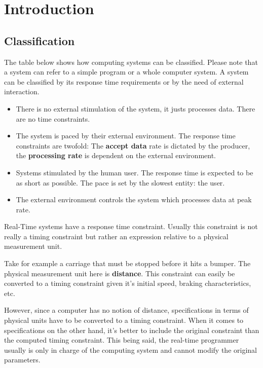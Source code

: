 \chapter{Introduction}

\section{Classification}

The table below shows how computing systems can be classified. Please note that a system can refer to a simple program or a whole computer system. A system can be classified by its response time requirements or by the need of external interaction. 

\begin{itemize}
	\item {} 
	There is no external stimulation of the system, it justs processes data. There are no time constraints.
	\item {}
	The system is paced by their external environment. The response time constraints are twofold: The \textbf{accept data} rate is dictated by the producer, the \textbf{processing rate} is dependent on the external environment.
	\item {}
	Systems stimulated by the human user. The response time is expected to be as short as possible. The pace is set by the slowest entity: the user.
	\item {}
	The external environment controls the system which processes data at peak rate.
\end{itemize}

Real-Time systems have a response time constraint. Usually this constraint is not really a timing constraint but rather an expression relative to a physical measurement unit.

\begin{exmp}
Take for example a carriage that must be stopped before it hits a bumper. The physical measurement unit here is \textbf{distance}. This constraint can easily be converted to a timing constraint given it's initial speed, braking characteristics, etc. 
\end{exmp}

However, since a computer has no notion of distance, specifications in terms of physical units have to be converted to a timing constraint.
When it comes to specifications on the other hand, it's better to include the original constraint than the computed timing constraint.
This being said, the real-time programmer usually is only in charge of the computing system and cannot modify the original parameters.

